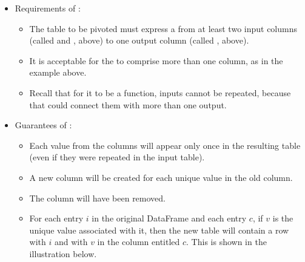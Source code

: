 \documentclass[letterpaper,10pt,english]{jupyterBook}
\begin{document}
\begin{itemize}
\item {} 
\sphinxAtStartPar
Requirements of :
\begin{itemize}
\item {} 
\sphinxAtStartPar
The table to be pivoted must express a  from at least two input columns (called  and , above) to one output column (called , above).

\item {} 
\sphinxAtStartPar
It is acceptable for the  to comprise more than one column, as in the example above.

\item {} 
\sphinxAtStartPar
Recall that for it to be a function, inputs cannot be repeated, because that could connect them with more than one output.

\end{itemize}

\item {} 
\sphinxAtStartPar
Guarantees of :
\begin{itemize}
\item {} 
\sphinxAtStartPar
Each value from the  columns will appear only once in the resulting table (even if they were repeated in the input table).

\item {} 
\sphinxAtStartPar
A new column will be created for each unique value in the old  column.

\item {} 
\sphinxAtStartPar
The  column will have been removed.

\item {} 
\sphinxAtStartPar
For each  entry \(i\) in the original DataFrame and each  entry \(c\), if \(v\) is the unique value associated with it, then the new table will contain a row with  \(i\) and with \(v\) in the column entitled \(c\).  This is shown in the illustration below.

\end{itemize}

\end{itemize}
\end{document}
